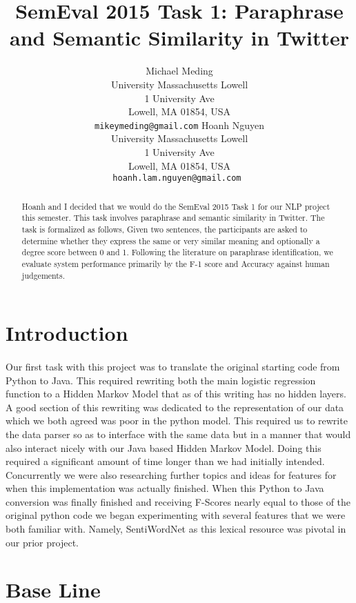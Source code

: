 \documentclass[11pt,letterpaper]{article}
\title{SemEval 2015 Task 1: Paraphrase and Semantic Similarity in Twitter}
\author{
	Michael Meding\\
  	University Massachusetts Lowell\\
	1 University Ave\\
	Lowell, MA 01854, USA\\
   {\tt mikeymeding@gmail.com}
	\And  
   Hoanh Nguyen\\
	University Massachusetts Lowell\\
	1 University Ave\\
	Lowell, MA 01854, USA\\
	{\tt hoanh.lam.nguyen@gmail.com }
}
\date{}
\begin{document}
\maketitle

\begin{abstract}
Hoanh and I decided that we would do the SemEval 2015 Task 1 for our NLP project this semester. This task involves paraphrase and semantic similarity in Twitter. The task is formalized as follows, Given two sentences, the participants are asked to determine whether they express the same or very similar meaning and optionally a degree score between 0 and 1. Following the literature on paraphrase identification, we evaluate system performance primarily by the F-1 score and Accuracy against human judgements. 
\end{abstract}

\section{Introduction}
\paragraph{} 
Our first task with this project was to translate the original starting code from Python to Java. This required rewriting both the main logistic regression function to a Hidden Markov Model that as of this writing has no hidden layers. A good section of this rewriting was dedicated to the representation of our data which we both agreed was poor in the python model. This required us to rewrite the data parser so as to interface with the same data but in a manner that would also interact nicely with our Java based Hidden Markov Model. Doing this required a significant amount of time longer than we had initially intended. Concurrently we were also researching further topics and ideas for features for when this implementation was actually finished. When this Python to Java conversion was finally finished and receiving F-Scores nearly equal to those of the original python code we began experimenting with several features that we were both familiar with. Namely, SentiWordNet as this lexical resource was pivotal in our prior project.

\section{Base Line}
\end{document}
